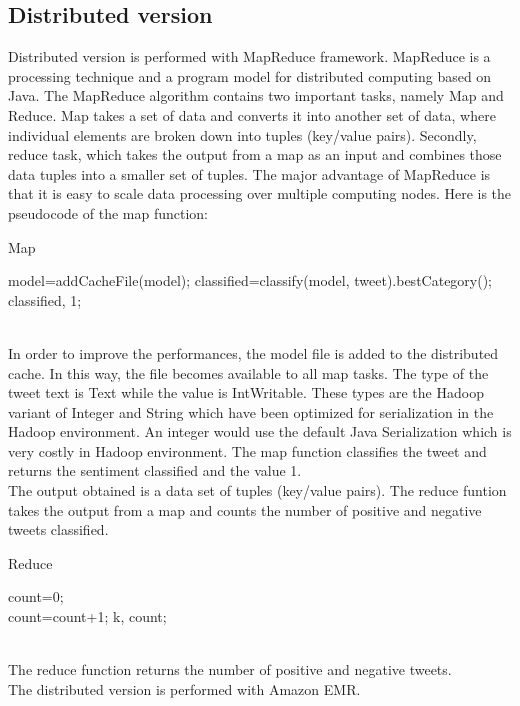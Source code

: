 \documentclass[10pt,twocolumn,letterpaper]{article}
\begin{document}
\subsection{Distributed version}
Distributed version is performed with MapReduce framework. MapReduce is a processing technique and a program model for distributed computing based on Java. The MapReduce algorithm contains two important tasks, namely Map and Reduce.  Map takes a set of data and converts it into another set of data, where individual elements are broken down into tuples (key/value pairs). Secondly, reduce task, which takes the output from a map as an input and combines those data tuples into a smaller set of tuples. The major advantage of MapReduce is that it is easy to scale data processing over multiple computing nodes. Here is the pseudocode of the map function:\\
\begin{algorithm}
\label{Map}
\caption{Map}
\begin{algorithmic}
\State model=addCacheFile(model);
\State classified=classify(model, tweet).bestCategory();
\State \Return classified, 1;
\end{algorithmic}
\end{algorithm} \\
In order to improve the performances, the model file is added to the distributed cache. In this way, the file becomes available to all map tasks. The type of the tweet text is Text while the value is IntWritable. These types are the Hadoop variant of Integer and String which have been optimized for serialization in the Hadoop environment. An integer would use the default Java Serialization which is very costly in Hadoop environment. The map function classifies the tweet and returns the sentiment classified and the value 1.\\
The output obtained is a data set of tuples (key/value pairs). The reduce funtion takes the output from a map and counts the number of positive and negative tweets classified.
\begin{algorithm}
\label{Reduce}
\caption{Reduce}
\begin{algorithmic}
\State count=0;
    	 \do \\
		\State count=count+1;
	\EndFor 
\State \Return k, count;
\end{algorithmic}
\end{algorithm} \\
The reduce function returns the number of positive and negative tweets.\\
The distributed version is performed with Amazon EMR.
\end{document}
